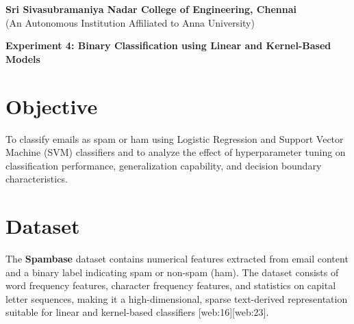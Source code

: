 \documentclass[11pt]{article}
\begin{document}
\begin{center}
\large \textbf{Sri Sivasubramaniya Nadar College of Engineering, Chennai} \\
(An Autonomous Institution Affiliated to Anna University) \\
\vspace{0.3cm}
\end{center}

\begin{table}[!h]
\renewcommand{\arraystretch}{1.5}
\end{table}

\begin{center}
\textbf{Experiment 4: Binary Classification using Linear and Kernel-Based Models}
\end{center}

\section*{Objective}
To classify emails as spam or ham using Logistic Regression and Support Vector Machine (SVM) classifiers and to analyze the effect of hyperparameter tuning on classification performance, generalization capability, and decision boundary characteristics.

\section*{Dataset}
The \textbf{Spambase} dataset contains numerical features extracted from email content and a binary label indicating spam or non-spam (ham). The dataset consists of word frequency features, character frequency features, and statistics on capital letter sequences, making it a high-dimensional, sparse text-derived representation suitable for linear and kernel-based classifiers [web:16][web:23].
\end{document}
